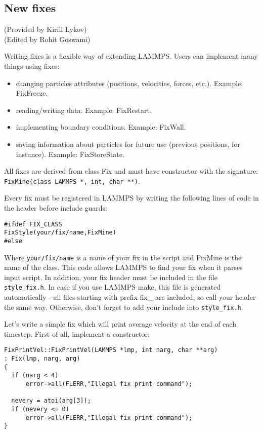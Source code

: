 \documentclass{article}
\newcommand{\path}[1]{\colorbox{light-gray}{\texttt{#1}}}
\begin{document}
\subsection{New fixes}

(Provided by Kirill Lykov)\\
(Edited by Rohit Goswami)
\vspace{0.25cm}

Writing fixes is a flexible way of extending LAMMPS. Users can
implement many things using fixes:

\begin{itemize}
\item changing particles attributes (positions, velocities, forces, etc.).
Example: FixFreeze.
\item reading/writing data. Example: FixRestart.
\item implementing boundary conditions. Example: FixWall.
\item saving information about particles for future use (previous positions,
for instance). Example: FixStoreState.
\end{itemize}

All fixes are derived from class Fix and must have constructor with the
signature: \texttt{FixMine(class LAMMPS *, int, char **)}.

Every fix must be registered in LAMMPS by writing the following lines
of code in the header before include guards:

 \begin{center}
 \begin{verbatim}
#ifdef FIX_CLASS
FixStyle(your/fix/name,FixMine)
#else
  \end{verbatim}
 \end{center}

Where \path{your/fix/name} is a name of your fix in the script and FixMine
is the name of the class. This code allows LAMMPS to find your fix
when it parses input script. In addition, your fix header must be
included in the file \path{style\_fix.h}. In case if you use LAMMPS make,
this file is generated automatically - all files starting with prefix
fix\_ are included, so call your header the same way. Otherwise, don't
forget to add your include into \path{style\_fix.h}.

Let's write a simple fix which will print average velocity at the end
of each timestep. First of all, implement a constructor:

 \begin{center}
 \begin{verbatim}
FixPrintVel::FixPrintVel(LAMMPS *lmp, int narg, char **arg)
: Fix(lmp, narg, arg)
{
  if (narg < 4)
      error->all(FLERR,"Illegal fix print command");

  nevery = atoi(arg[3]);
  if (nevery <= 0)
      error->all(FLERR,"Illegal fix print command");
}
  \end{verbatim}
 \end{center}
\end{document}

